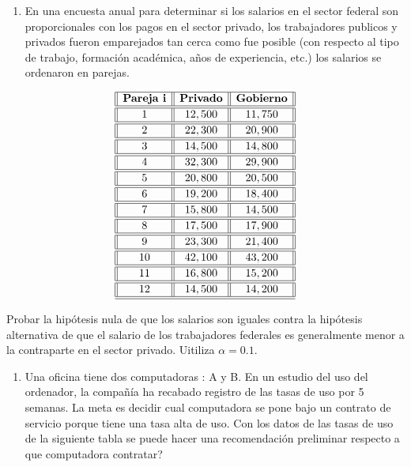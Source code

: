 \documentclass[
  a4paper,
  oneside,
  openany]{book}
\providecommand{\tightlist}{%
  \setlength{\itemsep}{0pt}\setlength{\parskip}{0pt}}
\begin{document}
\begin{enumerate}
\def\labelenumi{\arabic{enumi}.}
\tightlist
\item
  En una encuesta anual para determinar si los salarios en el sector federal son proporcionales con los pagos en el sector privado, los trabajadores publicos y privados fueron emparejados tan cerca como fue posible (con respecto al tipo de trabajo, formación académica, años de experiencia, etc.) los salarios se ordenaron en parejas.
\end{enumerate}

\[
\begin{array}{||c| |c| |c||} 
\hline 
\textbf{Pareja i}  & \textbf{Privado} & \textbf{Gobierno} \\ 
\hline
\hline
1 &12,500& 11,750 \\
\hline
\hline
2& 22,300 &20,900 \\
\hline
\hline
3 &14,500 &14,800 \\
\hline
\hline
4 &32,300 &29,900 \\
\hline
\hline
5 &20,800 &20,500 \\
\hline
\hline
6 &19,200 &18,400 \\
\hline
\hline
7 &15,800 &14,500 \\
\hline
\hline
8 &17,500 &17,900 \\
\hline
\hline
9 &23,300 &21,400 \\
\hline
\hline
10 &42,100 &43,200 \\
\hline
\hline
11 &16,800 &15,200 \\
\hline
\hline
12& 14,500 &14,200 \\
\hline
\hline
\end{array}
\]

Probar la hipótesis nula de que los salarios son iguales contra la hipótesis alternativa de que el salario de los trabajadores federales es generalmente menor a la contraparte en el sector privado. Uitiliza \(\alpha=0.1\).

\begin{enumerate}
\def\labelenumi{\arabic{enumi}.}
\setcounter{enumi}{1}
\tightlist
\item
  Una oficina tiene dos computadoras : A y B. En un estudio del uso del ordenador, la compañía ha recabado registro de las tasas de uso por 5 semanas. La meta es decidir cual computadora se pone bajo un contrato de servicio porque tiene una tasa alta de uso. Con los datos de las tasas de uso de la siguiente tabla se puede hacer una recomendación preliminar respecto a que computadora contratar?
\end{enumerate}
\end{document}
